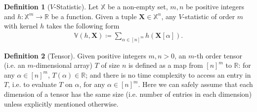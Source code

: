 \documentclass[12pt]{article}
\theoremstyle{plain}
\theoremstyle{definition}
\newtheorem{definition}{Definition}
\newtheorem{remark}{Remark}
\newcommand{\ustat}{\mathbb{U}}
\newcommand{\vstat}{\mathbb{V}}
\newcommand{\ustatp}[2]{\ustat(#1,#2)}
\newcommand{\vstatp}[2]{\vstat(#1,#2)}
\newcommand{\perm}[1]{\mathsf{Perm}(#1)}
\newcommand{\bbR}{{\mathbb{R}}}
\newcommand{\reals}{{\mathbb{R}}}
\def\bbX{\mathbb{X}}
\begin{document}
\begin{bibunit}[agsm]

\begin{definition}[$V$-Statistic]\label{def:v_stat}
Let $\bbX$ be a non-empty set, $m, n$ be positive integers and $h: \bbX^{m} \rightarrow \bbR$ be a function. Given a tuple $\bm{X} \in \bbX^n$, any $V$-statistic of order $m$ with kernel $h$ takes the following form 
    \begin{align*}
        \vstatp{h}{\bm{X}} \coloneqq \sum_{\alpha \in [n]^m} h(\bm{X}[\alpha]). 
    \end{align*} 
\end{definition}

\begin{definition}[Tensor]
\label{def:tensors}
Given positive integers $m, n > 0$, an $m$-th order tensor (i.e. an $m$-dimensional array) $T$ of size $n$ is defined as a map from $[n]^m$ to $\reals$: for any $\alpha \in [n]^{m}$, $T (\alpha) \in \bbR$; and there is no time complexity to access an entry in $T$, i.e. to evaluate $T$ on $\alpha$, for any $\alpha \in [n]^{m}$. Here we can safely assume that each dimension of a tensor has the same size (i.e. number of entries in each dimension) unless explicitly mentioned otherwise.
\end{definition}


\end{bibunit}
\end{document}
